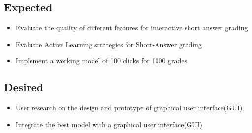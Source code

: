 \documentclass[rnd]{mas_proposal}
\begin{document}
\subsection{Expected}
\begin{itemize}
    \item Evaluate the quality of different features for interactive short answer grading
    \item Evaluate Active Learning strategies for Short-Answer grading
    \item Implement a working model of 100 clicks for 1000 grades
\end{itemize}

\subsection{Desired}
\begin{itemize}
	\item User research on the design and prototype of graphical user interface(GUI)
    \item Integrate the best model with a graphical user interface(GUI)
\end{itemize}


\nocite{*}




 
\end{document}

